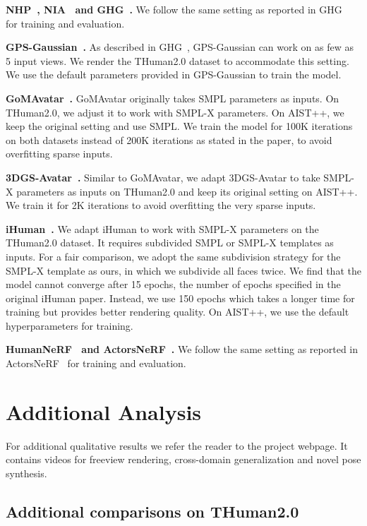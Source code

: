 \textbf{NHP~\citep{kwon2021neural}, NIA~\citep{kwon2023neural} and GHG~\citep{kwon2024ghg}.} We follow the same setting as reported in GHG~\citep{kwon2024ghg} for training and evaluation.

\textbf{GPS-Gaussian~\citep{zheng2024gpsgaussian}.} As described in GHG~\citep{kwon2024ghg}, GPS-Gaussian can work on as few as 5 input views. We render the THuman2.0 dataset to accommodate this setting. We use the default parameters provided in GPS-Gaussian to train the model.

\textbf{GoMAvatar~\citep{wen2024gomavatar}.} GoMAvatar originally takes SMPL parameters as inputs. On THuman2.0, we adjust it to work with SMPL-X parameters. On AIST++, we keep the original setting and use SMPL. We train the model for 100K iterations on both datasets instead of 200K iterations as stated in the paper, to avoid overfitting sparse inputs. 

\textbf{3DGS-Avatar~\citep{qian20243dgs}.} Similar to GoMAvatar, we adapt 3DGS-Avatar to take SMPL-X parameters as inputs on THuman2.0 and keep its original setting on AIST++. We train it for 2K iterations to avoid overfitting the very sparse inputs.

\textbf{iHuman~\citep{paudel2024ihuman}.} We adapt iHuman to work with SMPL-X parameters on the THuman2.0 dataset. It requires subdivided SMPL or SMPL-X templates as inputs. For a fair comparison, we adopt the same subdivision strategy for the SMPL-X template as ours, in which we subdivide all faces twice. We find that the model cannot converge after 15 epochs, the number of epochs specified in the original iHuman paper. Instead, we use 150 epochs which takes a longer time for training but provides better rendering quality. On AIST++, we use the default hyperparameters for training.

\textbf{HumanNeRF~\citep{Weng2022HumanNeRFFR} and ActorsNeRF~\citep{mu2023actorsnerf}.} We follow the same setting as reported in ActorsNeRF~\citep{mu2023actorsnerf} for training and evaluation.

\section{Additional Analysis}
\label{sec: appendix_result}

For additional qualitative results we refer the reader to the project webpage. It contains videos for freeview rendering, cross-domain generalization and novel pose synthesis.

\subsection{Additional comparisons on THuman2.0}

